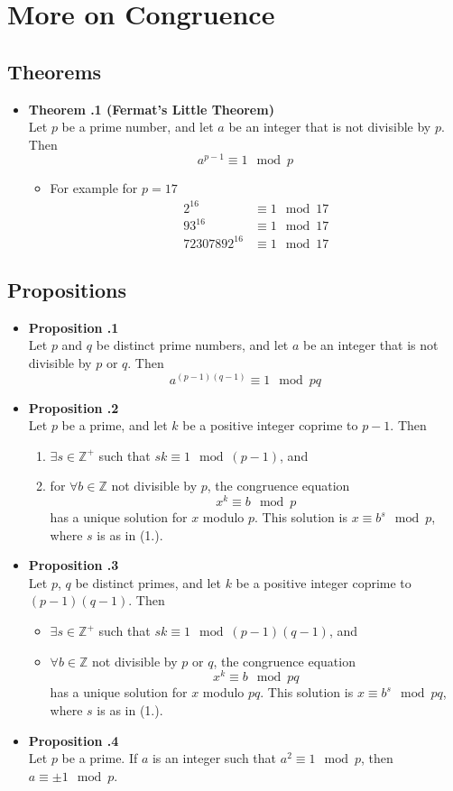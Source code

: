 \documentclass[a4paper,12pt]{article}
\newcommand{\prop}[1]{
    \item \textbf{Proposition \thesection.#1}\\
}
\newcommand{\theo}[1]{
    \item \textbf{Theorem \thesection.#1}\\
}
\begin{document}
\section{More on Congruence}
\subsection{Theorems}
\begin{itemize}
    \theo {1 (Fermat's Little Theorem)}
    Let $p$ be a prime number, and let $a$ be an integer that is not divisible by $p$.
    Then
        $$ a^{p-1} \equiv 1 \mod p $$
    \begin{itemize}
        \item For example for $p = 17$
            \begin{align*}
                       2^{16} &\equiv 1 \mod 17\\
                      93^{16} &\equiv 1 \mod 17\\
                72307892^{16} &\equiv 1 \mod 17
            \end{align*}
    \end{itemize}
\end{itemize}

\subsection{Propositions}
\begin{itemize}
    \prop 1
    Let $p$ and $q$ be distinct prime numbers, and let $a$ be an integer that is not
    divisible by $p$ or $q$. Then
        $$ a^{(p-1)(q-1)} \equiv 1 \mod pq $$
        
    \prop 2
    Let $p$ be a prime, and let $k$ be a positive integer coprime to $p - 1$. Then
    \begin{enumerate}
        \item $\exists s \in \mathbb{Z}^+$ such that $sk \equiv 1 \mod (p - 1)$, and
        \item for $\forall b \in \mathbb{Z}$ not divisible by $p$, the congruence
            equation
            $$ x^k \equiv b \mod p $$
            has a unique solution for $x$ modulo $p$. This solution is $x \equiv b^s \mod p$, where $s$ is as in (1.).
    \end{enumerate}
    
    \prop 3
    Let $p$, $q$ be distinct primes, and let $k$ be a positive integer coprime to
    $(p-1)(q-1)$. Then
    \begin{itemize}
        \item $\exists s \in \mathbb{Z}^+$ such that $sk \equiv 1 \mod (p-1)(q-1)$, and
        \item $\forall b \in \mathbb{Z}$ not divisible by $p$ or $q$, the congruence
            equation
            $$ x^k \equiv b \mod pq $$
            has a unique solution for $x$ modulo $pq$. This solution is $x \equiv b^s \mod pq$, where $s$ is as in (1.).
    \end{itemize}
    
    \prop 4
    Let $p$ be a prime. If $a$ is an integer such that $a^2 \equiv 1 \mod p$, then
    $a \equiv \pm1 \mod p$.
\end{itemize}
\end{document}
